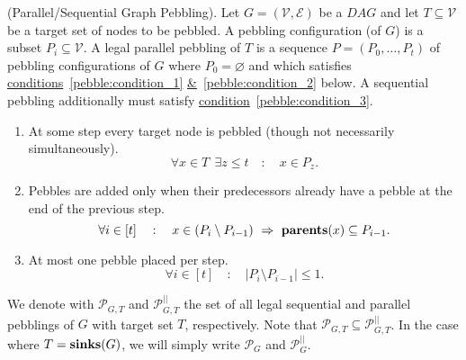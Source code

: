 \begin{definition}{(Parallel/Sequential Graph Pebbling).}\textnormal{\cite{cryptoeprint:2016:875}}
  Let $G=(\mathcal{V},\mathcal{E})$ be a $DAG$ and let $T \subseteq \mathcal{V}$ be a target set of nodes to be pebbled. A pebbling configuration (of $G$) is a subset $P_i \subseteq \mathcal{V}$. A legal parallel pebbling of $T$ is a sequence $P=(P_0,\dots,P_t)$ of pebbling configurations of $G$ where $P_0 = \varnothing$ and which satisfies \hyperref[pebble:condition_1]{conditions}~\ref{pebble:condition_1}
  \hyperref[pebble:condition_2]{\&}~\ref{pebble:condition_2} below. A sequential pebbling additionally must satisfy \hyperref[pebble:condition_3]{condition}~\ref{pebble:condition_3}.

  \begin{enumerate}
    \item \label{pebble:condition_1} At some step every target node is pebbled (though not necessarily simultaneously).
%
    \begin{equation}\label{eqn:pebcondition_1}
      \forall x \in T \ \ \exists z \leq t \quad : \quad x \in P_z.
    \end{equation}
%
    \item \label{pebble:condition_2} Pebbles are added only when their predecessors already have a pebble at the end of the previous step.
%
    \begin{equation}\label{eqn:pebcondition_2}
      \forall i \in [t] \quad : \quad x \in (P_i \setminus P_{i-1}) \ \Rightarrow \ \mbox{\textbf{parents}}(x) \subseteq P_{i-1}.
    \end{equation}
%
    \item \label{pebble:condition_3} At most one pebble placed per step.
%
    \begin{equation}\label{eqn:pebcondition_3}
      \forall i \in [t] \quad : \quad \lvert P_i \setminus P_{i-1} \rvert \leq 1.
    \end{equation}
%
  \end{enumerate}
%
  We denote with $\mathcal{P}_{G,T}$ and $\mathcal{P}_{G,T}^{||}$ the set of all legal sequential and parallel pebblings of $G$ with target set $T$, respectively.
  Note that $\mathcal{P}_{G,T} \subseteq \mathcal{P}_{G,T}^{||}$. In the case where $T=\mbox{\textbf{sinks}}(G)$, we will simply write $\mathcal{P}_{G}$ and
  $\mathcal{P}_{G}^{||}$.
%
\end{definition}
%
